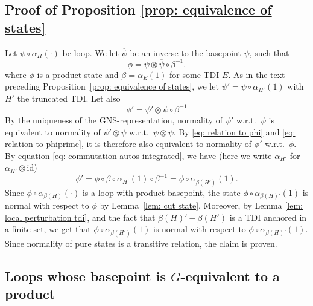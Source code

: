 \subsection{Proof of Proposition \ref{prop: equivalence of states}} \label{sec: proof of equivalence propo}
Let $\psi\circ\alpha_H(\cdot)$ be loop. We let $\overline{\psi}$ be an inverse to the basepoint $\psi$, such that
\begin{equation} \label{eq: relation to phi}
\phi=\psi \otimes \overline{\psi} \circ \beta^{-1}.
\end{equation}
where $\phi$ is a product state and $\beta=\alpha_{E}(1)$ for some TDI $E$.  As in the text preceding Proposition~\ref{prop: equivalence of states}, we let $\psi'=\psi \circ \alpha_{H'}(1)$ with $H'$ the truncated TDI. Let also
\begin{equation} \label{eq: relation to phiprime}
\phi'= \psi' \otimes \overline{\psi} \circ \beta^{-1}
\end{equation}
By the uniqueness of the GNS-representation, normality of $\psi'$ w.r.t.\ $\psi$ is equivalent to normality of $\psi'\otimes\overline{\psi}$ w.r.t.\  $\psi\otimes\overline{\psi}$. By \eqref{eq: relation to phi} and \eqref{eq: relation to phiprime}, it is therefore also equivalent to normality of $\phi'$ w.r.t.\  $\phi$. By equation \eqref{eq: commutation autos integrated}, we have (here we write $\alpha_{H'}$ for $\alpha_{H'}\otimes \mathrm{id}$)
$$
\phi'= \phi  \circ \beta \circ \alpha_{H'}(1) \circ \beta^{-1} =   \phi  \circ \alpha_{\beta(H')}(1).
$$
Since $\phi  \circ \alpha_{\beta(H)}(\cdot)$ is a loop with product basepoint, the state $\phi  \circ \alpha_{\beta(H)'}(1)$ is normal with respect to $\phi$ by Lemma~\ref{lem: cut state}.  
Moreover, by Lemma \ref{lem: local perturbation tdi}, and the fact that $\beta(H)'-\beta(H')$ is a TDI anchored in a finite set, we get that 
$\phi  \circ \alpha_{\beta(H')}(1) $  is normal with respect to $\phi  \circ \alpha_{\beta(H)'}(1) $.
Since normality of pure states is a transitive relation, the claim is proven. 



\subsection{Loops whose basepoint is $G$-equivalent to a product}\label{sec: loops with equivalent base}

